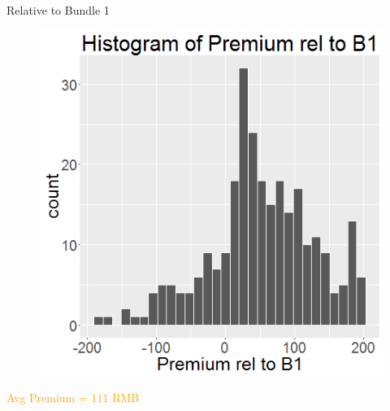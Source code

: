 \documentclass[xcolor=dvipsnames,12pt]{beamer}
\theoremstyle{definition}
\begin{document}
\begin{frame}{Relative to Bundle 1}
\begin{figure}

\graphicspath{ {../../1_relative_to_bundle_1/} }
\includegraphics[scale=0.43]{5_histogram_of_prem_rel_to_bundle_1_zoom_in_}
\end{figure}
\begin{center}
\textcolor{orange}{{\Huge Avg Premium = $111$ RMB}} %
\end{center}
\end{frame}
\end{document}

